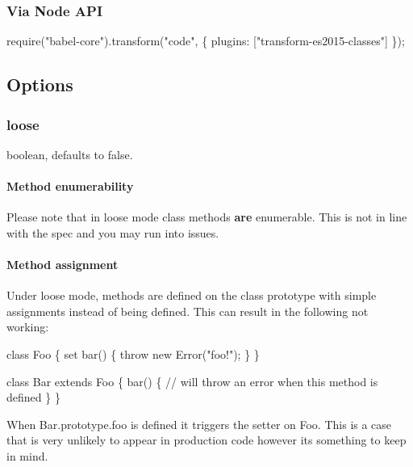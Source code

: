 \subsubsection*{Via Node A\+PI}


\begin{DoxyCode}
require("babel-core").transform("code", \{
  plugins: ["transform-es2015-classes"]
\});
\end{DoxyCode}


\subsection*{Options}

\subsubsection*{{\ttfamily loose}}

{\ttfamily boolean}, defaults to {\ttfamily false}.

\paragraph*{Method enumerability}

Please note that in loose mode class methods {\bfseries are} enumerable. This is not in line with the spec and you may run into issues.

\paragraph*{Method assignment}

Under loose mode, methods are defined on the class prototype with simple assignments instead of being defined. This can result in the following not working\+:


\begin{DoxyCode}
class Foo \{
  set bar() \{
    throw new Error("foo!");
  \}
\}

class Bar extends Foo \{
  bar() \{
    // will throw an error when this method is defined
  \}
\}
\end{DoxyCode}


When {\ttfamily Bar.\+prototype.\+foo} is defined it triggers the setter on {\ttfamily Foo}. This is a case that is very unlikely to appear in production code however it\textquotesingle{}s something to keep in mind. 
